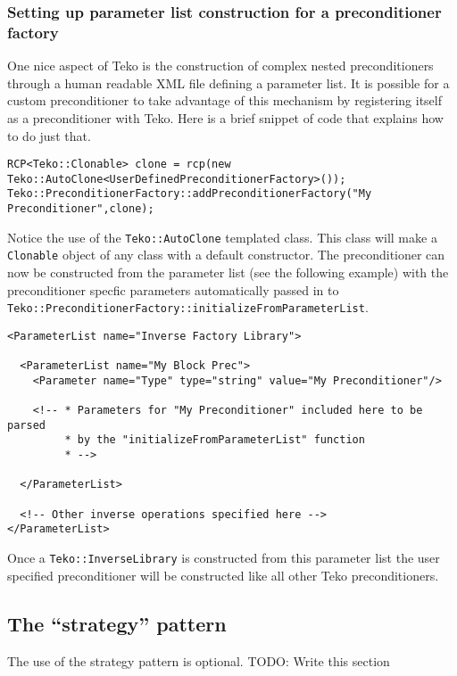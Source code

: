 \documentclass[12pt]{article}
\newcommand{\code}[1]{\lstinline[basicstyle=\footnotesize]!#1!}
\begin{document}
\subsubsection{Setting up parameter list construction for a preconditioner factory}
One nice aspect of Teko is the construction of complex nested preconditioners through
a human readable XML file defining a parameter list. It is possible for a custom
preconditioner to take advantage of this mechanism by registering itself as a preconditioner
with Teko. Here is a brief snippet of code that explains how to do just that.
\begin{framed}
\begin{lstlisting}
RCP<Teko::Clonable> clone = rcp(new Teko::AutoClone<UserDefinedPreconditionerFactory>());
Teko::PreconditionerFactory::addPreconditionerFactory("My Preconditioner",clone);
\end{lstlisting}
\end{framed}
\noindent Notice the use of the \code{Teko::AutoClone} templated class. This class will make a \code{Clonable}
object of any class with a default constructor. The preconditioner can now be constructed
from the parameter list (see the following example) with the preconditioner specfic parameters automatically passed
in to \code{Teko::PreconditionerFactory::initializeFromParameterList}.
\begin{framed}
\begin{lstlisting}
<ParameterList name="Inverse Factory Library">

  <ParameterList name="My Block Prec">
    <Parameter name="Type" type="string" value="My Preconditioner"/>

    <!-- * Parameters for "My Preconditioner" included here to be parsed
         * by the "initializeFromParameterList" function
         * -->

  </ParameterList>

  <!-- Other inverse operations specified here -->
</ParameterList>
\end{lstlisting}
\end{framed}
\noindent Once a \code{Teko::InverseLibrary} is constructed from this parameter list
the user specified preconditioner will be constructed like all other Teko
preconditioners.

\subsection{The ``strategy'' pattern}
The use of the strategy pattern is optional. TODO: Write this section
\end{document}
